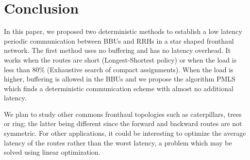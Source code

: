 \documentclass[10pt, conference, letterpaper]{IEEEtran}
\begin{document}
 \section{Conclusion}
In this paper, we proposed two deterministic methods to establish a low latency periodic communication between BBUs and RRHs in 
a star shaped fronthaul network. The first method uses no buffering and has no latency overhead. It works when the routes are short (Longest-Shortest policy) or when the load is less than $80\%$ (Exhaustive search of compact assignments).  
When the load is higher, buffering is allowed in the BBUs and we propose the algorithm PMLS which  finds a deterministic communication scheme with almost no additional latency.

We plan to study other commons fronthaul topologies such as caterpillars, trees or ring; the latter being different since 
the forward and backward routes are not symmetric. For other applications, it could be interesting to optimize the average latency of the routes rather than the worst latency, a problem which may be solved using linear optimization.  

%    
% 

%   



\end{document}
